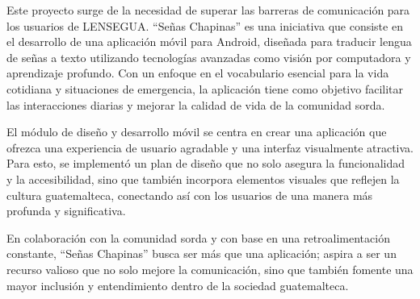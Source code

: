 Este proyecto surge de la necesidad de superar las barreras de comunicación para los usuarios de LENSEGUA. ``Señas Chapinas'' es una iniciativa que consiste en el desarrollo de una aplicación móvil para Android, diseñada para traducir lengua de señas a texto utilizando tecnologías avanzadas como visión por computadora y aprendizaje profundo. Con un enfoque en el vocabulario esencial para la vida cotidiana y situaciones de emergencia, la aplicación tiene como objetivo facilitar las interacciones diarias y mejorar la calidad de vida de la comunidad sorda. 

El módulo de diseño y desarrollo móvil se centra en crear una aplicación que ofrezca una experiencia de usuario agradable y una interfaz visualmente atractiva. Para esto, se implementó un plan de diseño que no solo asegura la funcionalidad y la accesibilidad, sino que también incorpora elementos visuales que reflejen la cultura guatemalteca, conectando así con los usuarios de una manera más profunda y significativa.

En colaboración con la comunidad sorda y con base en una retroalimentación constante, ``Señas Chapinas'' busca ser más que una aplicación; aspira a ser un recurso valioso que no solo mejore la comunicación, sino que también fomente una mayor inclusión y entendimiento dentro de la sociedad guatemalteca.
